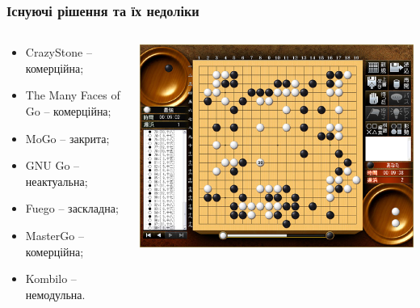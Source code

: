 \documentclass{beamer}
\begin{document}
\begin{frame}


\end{frame}

\begin{frame}
    \frametitle{Існуючі рішення та їх недоліки}
    \begin{columns}
    \begin{column}{0.5\textwidth}
        \begin{itemize}
            \item CrazyStone -- комерційна;
            \item The Many Faces of Go -- комерційна;
            \item MoGo -- закрита;
            \item GNU Go -- неактуальна;
            \item Fuego -- заскладна;
            \item MasterGo -- комерційна;
            \item Kombilo -- немодульна.
        \end{itemize}
    \end{column}
    \begin{column}{0.5\textwidth}
        \hfill\includegraphics[height=0.4\paperheight]{crazystone.jpg}
    \end{column}
    \end{columns}


\end{frame}
\end{document}
